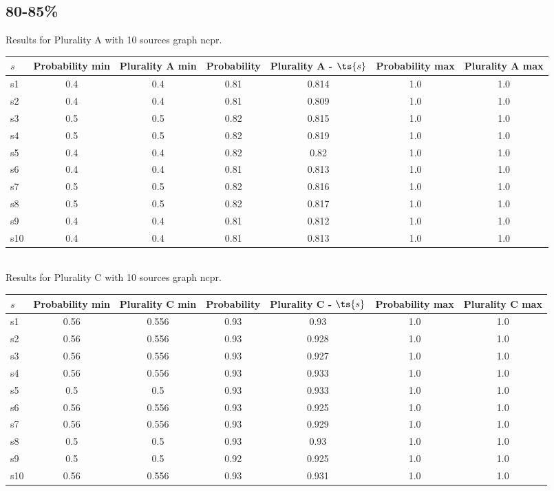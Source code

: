 \documentclass{article}
\begin{document}
\newpage

\subsection{80-85\%}

\noindent Results for Plurality A with 10 sources graph ncpr.

\noindent\begin{tabular}{|l|c|c|c|c|c|c|}
\hline
$s$& Probability min & Plurality A min & Probability & Plurality A - $\ts{s}$ & Probability max & Plurality A max\\
\hline
s1 &0.4 & 0.4 & 0.81 & 0.814 & 1.0 & 1.0\\
\hline
s2 &0.4 & 0.4 & 0.81 & 0.809 & 1.0 & 1.0\\
\hline
s3 &0.5 & 0.5 & 0.82 & 0.815 & 1.0 & 1.0\\
\hline
s4 &0.5 & 0.5 & 0.82 & 0.819 & 1.0 & 1.0\\
\hline
s5 &0.4 & 0.4 & 0.82 & 0.82 & 1.0 & 1.0\\
\hline
s6 &0.4 & 0.4 & 0.81 & 0.813 & 1.0 & 1.0\\
\hline
s7 &0.5 & 0.5 & 0.82 & 0.816 & 1.0 & 1.0\\
\hline
s8 &0.5 & 0.5 & 0.82 & 0.817 & 1.0 & 1.0\\
\hline
s9 &0.4 & 0.4 & 0.81 & 0.812 & 1.0 & 1.0\\
\hline
s10 &0.4 & 0.4 & 0.81 & 0.813 & 1.0 & 1.0\\
\hline
\end{tabular}\\

\noindent Results for Plurality C with 10 sources graph ncpr.

\noindent\begin{tabular}{|l|c|c|c|c|c|c|}
\hline
$s$& Probability min & Plurality C min & Probability & Plurality C - $\ts{s}$ & Probability max & Plurality C max\\
\hline
s1 &0.56 & 0.556 & 0.93 & 0.93 & 1.0 & 1.0\\
\hline
s2 &0.56 & 0.556 & 0.93 & 0.928 & 1.0 & 1.0\\
\hline
s3 &0.56 & 0.556 & 0.93 & 0.927 & 1.0 & 1.0\\
\hline
s4 &0.56 & 0.556 & 0.93 & 0.933 & 1.0 & 1.0\\
\hline
s5 &0.5 & 0.5 & 0.93 & 0.933 & 1.0 & 1.0\\
\hline
s6 &0.56 & 0.556 & 0.93 & 0.925 & 1.0 & 1.0\\
\hline
s7 &0.56 & 0.556 & 0.93 & 0.929 & 1.0 & 1.0\\
\hline
s8 &0.5 & 0.5 & 0.93 & 0.93 & 1.0 & 1.0\\
\hline
s9 &0.5 & 0.5 & 0.92 & 0.925 & 1.0 & 1.0\\
\hline
s10 &0.56 & 0.556 & 0.93 & 0.931 & 1.0 & 1.0\\
\hline
\end{tabular}\\
\end{document}
